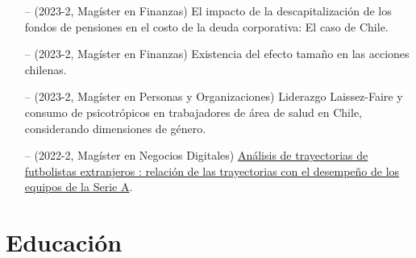 \documentclass[11pt,a4paper,]{awesome-cv}
\begin{document}
\vspace{-0.3cm} \begingroup \footnotesize

\begin{itemize}
    \item[--] (2023-2, Magíster en Finanzas) El impacto de la descapitalización de los fondos de pensiones en el costo de la deuda corporativa: El caso de Chile.
    \item[--] (2023-2, Magíster en Finanzas) Existencia del efecto tamaño en las acciones chilenas.
    \item[--] (2023-2, Magíster en Personas y Organizaciones) Liderazgo Laissez-Faire y consumo de psicotrópicos en trabajadores de área de salud en Chile, considerando dimensiones de género.
    \item[--] (2022-2, Magíster en Negocios Digitales) \href{https://repositoriobiblioteca.udp.cl/TD002496.pdf#pagemode=thumbs}{Análisis de trayectorias de futbolistas extranjeros : relación de las trayectorias con el desempeño de los equipos de la Serie A}.
  \end{itemize}
  \endgroup

\section{Educación}\label{educaciuxf3n}

\begin{cventries}
    \vspace{-4.0mm}
\end{cventries}\vspace{-0.5cm}\begin{cventries}
    \vspace{-4.0mm}
\end{cventries}\vspace{-0.5cm}\begin{cventries}
    \vspace{-4.0mm}
\end{cventries}
\end{document}
